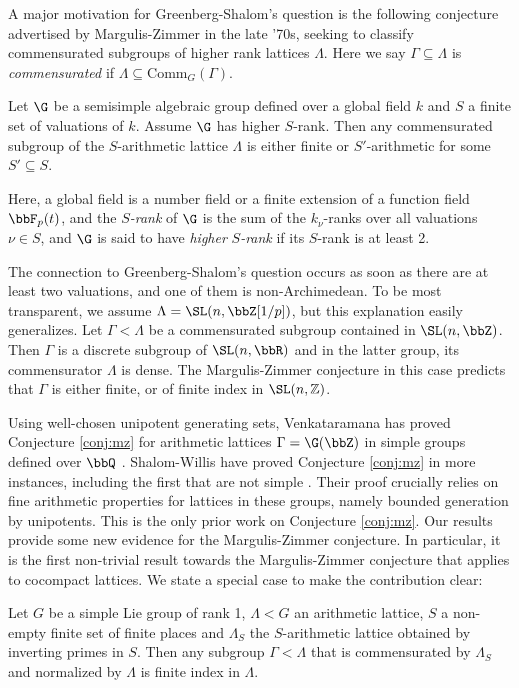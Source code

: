 A major motivation for Greenberg-Shalom's question is the following conjecture advertised by Margulis-Zimmer in the late '70s, seeking to classify commensurated subgroups of higher rank lattices $\Lambda$. Here we say $\Gamma\subseteq\Lambda$ is \emph{commensurated} if $\Lambda\subseteq \text{Comm}_G(\Gamma)$.

\begin{conj} \label{conj:mz}
Let $\G$ be a semisimple algebraic group defined over a global field $k$ and $S$ a finite set of valuations of $k$. Assume $\G$ has higher $S$-rank. Then any commensurated subgroup of the $S$-arithmetic lattice $\Lambda$ is either finite or $S'$-arithmetic for some $S'\subseteq S$.
\end{conj}

Here, a global field is a number field or a finite extension of a function field $\bbF_p(t)$, and the $S$\emph{-rank} of $\G$ is the sum of the $k_{\nu}$-ranks over all valuations $\nu\in S$, and $\G$ is said to have \emph{higher }$S$\emph{-rank} if its $S$-rank is at least 2.

The connection to Greenberg-Shalom's question occurs as soon as there are at least two valuations, and one of them is non-Archimedean.
To be most transparent, we assume $\Lambda = \SL(n, \bbZ[1/p])$, but this explanation easily generalizes. Let $\Gamma < \Lambda$ be a commensurated subgroup contained in $\SL(n, \bbZ)$.
Then $\Gamma$ is a discrete subgroup of $\SL(n,\bbR)$ and in the latter group, its commensurator $\Lambda$ is dense. The Margulis-Zimmer conjecture in this case predicts that $\Gamma$ is either finite, or of finite index in $\SL(n,\mathbb{Z})$.

Using well-chosen unipotent generating sets, Venkataramana has proved Conjecture \ref{conj:mz} for arithmetic lattices $\Gamma=\G(\bbZ)$ in simple groups defined over $\bbQ$ \cite{venkataramana-mz}. Shalom-Willis have proved Conjecture \ref{conj:mz} in more instances, including the first that are not simple \cite{shalom-willis}. Their proof crucially relies on fine arithmetic properties for lattices in these groups, namely bounded generation by unipotents. This is the only prior work on Conjecture \ref{conj:mz}. Our results provide some new evidence for the Margulis-Zimmer conjecture. In particular, it is the first non-trivial result towards the Margulis-Zimmer conjecture that applies to cocompact lattices. We state a special case to make the contribution clear:

\begin{cor}
\label{corollary:marguliszimmer}
Let $G$ be a simple Lie group of rank 1, $\Lambda < G$ an arithmetic lattice, $S$ a non-empty finite set of finite places and $\Lambda_S$ the $S$-arithmetic lattice obtained by inverting primes in $S$. Then any subgroup $\Gamma< \Lambda$ that is commensurated by $\Lambda_S$ and normalized by $\Lambda$ is finite index in $\Lambda$.
\end{cor}

